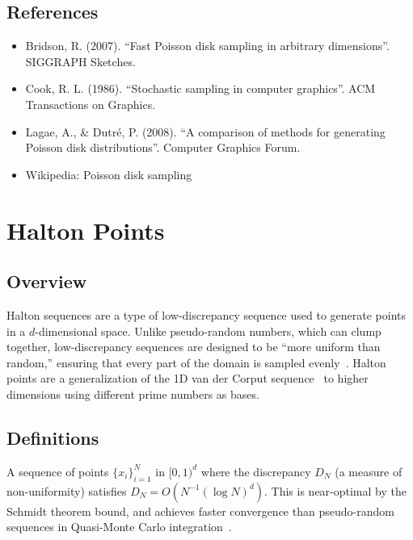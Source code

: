 \subsection{References}
\begin{itemize}
    \item Bridson, R. (2007). ``Fast Poisson disk sampling in arbitrary dimensions''. SIGGRAPH Sketches.
    \item Cook, R. L. (1986). ``Stochastic sampling in computer graphics''. ACM Transactions on Graphics.
    \item Lagae, A., \& Dutr\'{e}, P. (2008). ``A comparison of methods for generating Poisson disk distributions''. Computer Graphics Forum.
    \item Wikipedia: Poisson disk sampling
\end{itemize}


\section{Halton Points}
\label{sec:halton_points}

\subsection{Overview}
Halton sequences are a type of low-discrepancy sequence used to generate points in a $d$-dimensional space. Unlike pseudo-random numbers, which can clump together, low-discrepancy sequences are designed to be ``more uniform than random,'' ensuring that every part of the domain is sampled evenly~\cite{halton1960}. Halton points are a generalization of the 1D van der Corput sequence~\cite{vandercorput1935} to higher dimensions using different prime numbers as bases.

\subsection{Definitions}
\begin{definition}\label{def:low_discrepancy_sequence}
A sequence of points $\{x_i\}_{i=1}^N$ in $[0,1)^d$ where the discrepancy $D_N$ (a measure of non-uniformity) satisfies $D_N = O(N^{-1} (\log N)^d)$. This is near-optimal by the Schmidt theorem bound, and achieves faster convergence than pseudo-random sequences in Quasi-Monte Carlo integration~\cite{niederreiter1992}.
\end{definition}

